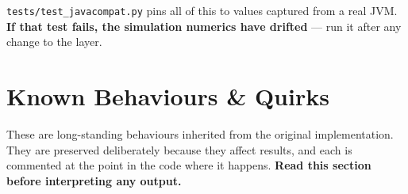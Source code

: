 \documentclass[11pt, a4paper]{article}
\newcommand{\code}[1]{\texttt{#1}}
\begin{document}
\medskip
\code{tests/test\_javacompat.py} pins all of this to values captured from a real
JVM. \textbf{If that test fails, the simulation numerics have drifted} --- run it
after any change to the layer.

\section{Known Behaviours \& Quirks}
\label{sec:quirks}

These are long-standing behaviours inherited from the original implementation.
They are preserved deliberately because they affect results, and each is
commented at the point in the code where it happens. \textbf{Read this section
before interpreting any output.}
\end{document}
